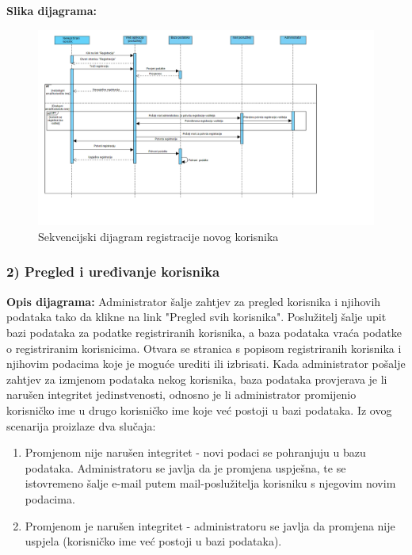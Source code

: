 				\textbf{Slika dijagrama:}
				\begin{figure}[H]
					\includegraphics[scale=0.4]{slike/Registracija}
					\centering
					\caption{Sekvencijski dijagram registracije novog korisnika}
					
				\end{figure}
				
				\subsubsection{2) Pregled i uređivanje korisnika}
				
				\textbf{Opis dijagrama:}
				Administrator šalje zahtjev za pregled korisnika i njihovih podataka tako da klikne na link "Pregled svih korisnika". Poslužitelj šalje upit bazi podataka za podatke registriranih korisnika, a baza podataka vraća podatke o registriranim korisnicima. Otvara se stranica s popisom registriranih korisnika i njihovim podacima koje je moguće urediti ili izbrisati. Kada administrator pošalje zahtjev za izmjenom podataka nekog korisnika, baza podataka provjerava je li narušen integritet jedinstvenosti, odnosno je li administrator promijenio korisničko ime u drugo korisničko ime koje već postoji u bazi podataka. Iz ovog scenarija proizlaze dva slučaja:
				
				\begin{enumerate}
					    \item Promjenom nije narušen integritet - novi podaci se pohranjuju u bazu podataka. Administratoru se javlja da je promjena uspješna, te se istovremeno šalje e-mail putem mail-poslužitelja korisniku s njegovim novim podacima.
						\item Promjenom je narušen integritet - administratoru se javlja da promjena nije uspjela (korisničko ime već postoji u bazi podataka).
				\end{enumerate}
					
